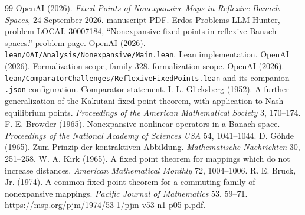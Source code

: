 \documentclass[11pt]{article}
\theoremstyle{definition}\newtheorem{definition}[theorem]{Definition}
\begin{document}
\begingroup\sloppy
\begin{thebibliography}{99}
 OpenAI (2026). \emph{Fixed Points of Nonexpansive Maps in Reflexive Banach Spaces}, 24 September 2026. \href{https://github.com/openai/math/blob/adc7f1241b42e322a6451854ab7e4b4c146bf78a/preprints/Fixed-Points-of-Nonexpansive-Maps-in-Reflexive-Banach-Spaces-September-24-2026/paper.pdf}{manuscript PDF}.
 Erdos Problems LLM Hunter, problem LOCAL-30007184, ``Nonexpansive fixed points in reflexive Banach spaces.'' \href{https://mehmetmars7.github.io/Erdosproblems-llm-hunter/problem.html?type=open_problems&id=30007184}{problem page}.
 OpenAI (2026). \texttt{lean/OAI/Analysis/Nonexpansive/Main.lean}. \href{https://github.com/openai/math/blob/adc7f1241b42e322a6451854ab7e4b4c146bf78a/lean/OAI/Analysis/Nonexpansive/Main.lean}{Lean implementation}.
 OpenAI (2026). Formalization scope, family 328. \href{https://github.com/openai/math/blob/adc7f1241b42e322a6451854ab7e4b4c146bf78a/lean/docs/328.md}{formalization scope}.
 OpenAI (2026). \texttt{lean/ComparatorChallenges/ReflexiveFixedPoints.lean} and its companion \texttt{.json} configuration. \href{https://github.com/openai/math/blob/adc7f1241b42e322a6451854ab7e4b4c146bf78a/lean/ComparatorChallenges/ReflexiveFixedPoints.lean}{Comparator statement}.
 I. L. Glicksberg (1952). A further generalization of the Kakutani fixed point theorem, with application to Nash equilibrium points. \emph{Proceedings of the American Mathematical Society} 3, 170--174.
 F. E. Browder (1965). Nonexpansive nonlinear operators in a Banach space. \emph{Proceedings of the National Academy of Sciences USA} 54, 1041--1044.
 D. G\"ohde (1965). Zum Prinzip der kontraktiven Abbildung. \emph{Mathematische Nachrichten} 30, 251--258.
 W. A. Kirk (1965). A fixed point theorem for mappings which do not increase distances. \emph{American Mathematical Monthly} 72, 1004--1006.
 R. E. Bruck, Jr. (1974). A common fixed point theorem for a commuting family of nonexpansive mappings. \emph{Pacific Journal of Mathematics} 53, 59--71. \url{https://msp.org/pjm/1974/53-1/pjm-v53-n1-p05-p.pdf}.
\end{thebibliography}
\endgroup
\end{document}
